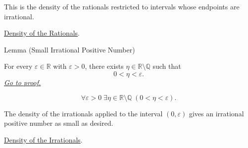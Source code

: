 \begin{remark*}[Interpretation]
This is the density of the rationals restricted to intervals whose endpoints
are irrational.
\end{remark*}

\begin{dependencies}
\hyperref[thm:density-of-rationals-in-reals]{Density of the Rationals}.
\end{dependencies}

\begin{lemmabox}{Lemma (Small Irrational Positive Number)}
\begin{lemma}
\label{lem:small-irrational-positive-number}
For every $\varepsilon\in\mathbb{R}$ with $\varepsilon>0$, there exists
$\eta\in\mathbb{R}\setminus\mathbb{Q}$ such that
\[
  0<\eta<\varepsilon.
\]
\hyperref[prf:small-irrational-positive-number]{\textit{Go to proof.}}
\end{lemma}
\end{lemmabox}

\begin{remark*}
\[
\forall \varepsilon>0\;\exists \eta\in\mathbb{R}\setminus\mathbb{Q}\;
(0<\eta<\varepsilon).
\]
\end{remark*}

\begin{remark*}[Interpretation]
The density of the irrationals applied to the interval $(0,\varepsilon)$ gives
an irrational positive number as small as desired.
\end{remark*}

\begin{dependencies}
\hyperref[thm:density-of-irrationals-in-reals]{Density of the Irrationals}.
\end{dependencies}

